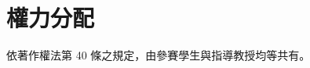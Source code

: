 \documentclass[12pt]{article}
\begin{document}
\section{權力分配}
依著作權法第 40 條之規定，由參賽學生與指導教授均等共有。


\end{document}
